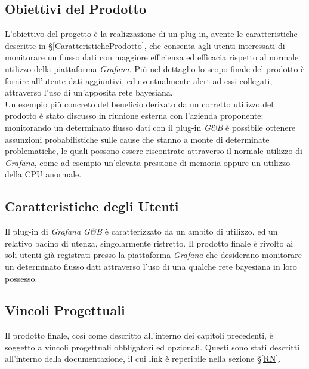 \subsection{Obiettivi del Prodotto}\label{ObiettiviProdotto}
L'obiettivo del progetto è la realizzazione di un plug-in, avente le caratteristiche descritte in §\ref{CaratteristicheProdotto}, che consenta agli utenti interessati di monitorare un flusso dati con maggiore efficienza ed efficacia rispetto al normale utilizzo della piattaforma \textit{Grafana}. Più nel dettaglio lo scopo finale del prodotto è fornire all'utente dati aggiuntivi, ed eventualmente alert ad essi collegati, attraverso l'uso di un'apposita rete bayesiana.\\
Un esempio più concreto del beneficio derivato da un corretto utilizzo del prodotto è stato discusso in riunione esterna con l'azienda proponente: monitorando un determinato flusso dati con il plug-in \textit{G\&B} è possibile ottenere assunzioni probabilistiche sulle cause che stanno a monte di determinate problematiche, le quali possono essere riscontrate attraverso il normale utilizzo di \textit{Grafana}, come ad esempio un'elevata pressione di memoria oppure un utilizzo della CPU anormale.

\subsection{Caratteristiche degli Utenti}\label{CaratteristicheUtenti}
Il plug-in di \textit{Grafana} \textit{G\&B} è caratterizzato da un ambito di utilizzo, ed un relativo bacino di utenza, singolarmente ristretto. Il prodotto finale è rivolto ai soli utenti già registrati presso la piattaforma \textit{Grafana} che desiderano monitorare un determinato flusso dati attraverso l'uso di una qualche rete bayesiana in loro possesso.

\subsection{Vincoli Progettuali}
\label{VincoliProgettuali}

Il prodotto finale, così come descritto all'interno dei capitoli precedenti, è soggetto a vincoli progettuali obbligatori ed opzionali. Questi sono stati descritti all'interno della documentazione, il cui link è reperibile nella sezione §\ref{RN}. \\

